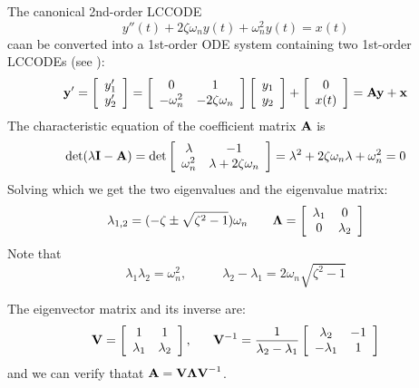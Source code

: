 \usepackage{html}




The canonical 2nd-order LCCODE 
\[
y''(t)+2\zeta\omega_n y(t)+\omega_n^2 y(t)=x(t)
\]
caan be converted into a 1st-order ODE system containing two 
1st-order LCCODEs (see 
):
\[
{\bf y}'=\left[\begin{array}{c}y_1'\\y_2'\end{array}\right]
=\left[\begin{array}{cc}0 & 1\\-\omega_n^2 & -2\zeta\omega_n\end{array}
\right]\left[\begin{array}{c}y_1\\y_2\end{array}\right]
+\left[\begin{array}{c}0\\x(t)\end{array}\right]
={\bf Ay}+{\bf x}
\]
The characteristic equation of the coefficient matrix ${\bf A}$ is
\[
\det(\lambda{\bf I}-{\bf A})
=\det\left[\begin{array}{cc}\lambda & -1\\\omega_n^2 & \lambda+2\zeta\omega_n
\end{array}\right]
=\lambda^2+2\zeta\omega_n\lambda+\omega_n^2=0
\]
Solving which we get the two eigenvalues and the eigenvalue matrix:
\[
\lambda_{1,2}=(-\zeta\pm\sqrt{\zeta^2-1})\omega_n
\;\;\;\;\;\;\;
{\bf\Lambda}=\left[\begin{array}{cc}\lambda_1 & 0\\0 & \lambda_2\end{array}\right]
\]
Note that
\[
\lambda_1\lambda_2=\omega_n^2,\;\;\;\;\;\;\;\;\;\;
\lambda_2-\lambda_1=2\omega_n\sqrt{\zeta^2-1}
\]

The eigenvector matrix and its inverse are:
\[
{\bf V}=\left[\begin{array}{cc}1 & 1\\ \lambda_1 & \lambda_2\end{array}\right],
\;\;\;\;\;\;
{\bf V}^{-1}=\frac{1}{\lambda_2-\lambda_1}
\left[\begin{array}{cc}\lambda_2 & -1\\ -\lambda_1 & 1\end{array}\right]
\]
and we can verify thatat ${\bf A}={\bf V\Lambda V}^{-1}$. 

